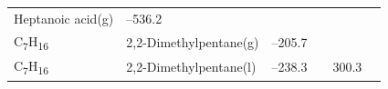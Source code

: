 \documentclass[
  9pt,
]{extbook}
\theoremstyle{definition}
\theoremstyle{definition}
\theoremstyle{definition}
\theoremstyle{remark}
\begin{document}
\begin{longtable}[]{@{}llllll@{}}
\begin{minipage}[t]{0.17\columnwidth}
Heptanoic acid(g)\strut
\end{minipage} & \begin{minipage}[t]{0.15\columnwidth}\raggedright
--536.2\strut
\end{minipage} & \begin{minipage}[t]{0.15\columnwidth}\raggedright
\strut
\end{minipage} & \begin{minipage}[t]{0.14\columnwidth}\raggedright
\strut
\end{minipage} & \begin{minipage}[t]{0.14\columnwidth}\raggedright
\strut
\end{minipage}\tabularnewline
\begin{minipage}[t]{0.07\columnwidth}\raggedright
C\textsubscript{7}H\textsubscript{16}\strut
\end{minipage} & \begin{minipage}[t]{0.17\columnwidth}\raggedright
2,2-Dimethylpentane(g)\strut
\end{minipage} & \begin{minipage}[t]{0.15\columnwidth}\raggedright
--205.7\strut
\end{minipage} & \begin{minipage}[t]{0.15\columnwidth}\raggedright
\strut
\end{minipage} & \begin{minipage}[t]{0.14\columnwidth}\raggedright
\strut
\end{minipage} & \begin{minipage}[t]{0.14\columnwidth}\raggedright
\strut
\end{minipage}\tabularnewline
\begin{minipage}[t]{0.07\columnwidth}\raggedright
C\textsubscript{7}H\textsubscript{16}\strut
\end{minipage} & \begin{minipage}[t]{0.17\columnwidth}\raggedright
2,2-Dimethylpentane(l)\strut
\end{minipage} & \begin{minipage}[t]{0.15\columnwidth}\raggedright
--238.3\strut
\end{minipage} & \begin{minipage}[t]{0.15\columnwidth}\raggedright
\strut
\end{minipage} & \begin{minipage}[t]{0.14\columnwidth}\raggedright
300.3\strut
\end{minipage} & \begin{minipage}[t]{0.14\columnwidth}\raggedright

\end{minipage}
\end{longtable}
\end{document}
